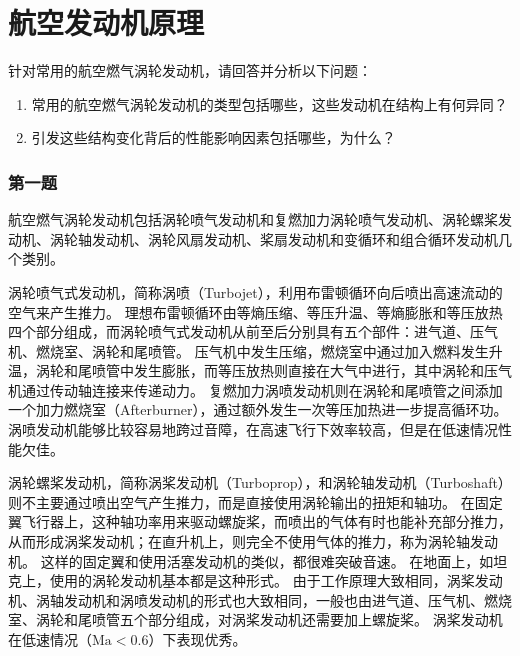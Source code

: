 
\part{航空发动机原理}

\begin{tcolorbox}
    针对常用的航空燃气涡轮发动机，请回答并分析以下问题：
    \begin{enumerate}
        \item 常用的航空燃气涡轮发动机的类型包括哪些，这些发动机在结构上有何异同？
        \item 引发这些结构变化背后的性能影响因素包括哪些，为什么？
    \end{enumerate}
\end{tcolorbox}

\section{第一题}

航空燃气涡轮发动机包括涡轮喷气发动机和复燃加力涡轮喷气发动机、涡轮螺桨发动机、涡轮轴发动机、涡轮风扇发动机、桨扇发动机和变循环和组合循环发动机几个类别。

涡轮喷气式发动机，简称涡喷（Turbojet），利用布雷顿循环向后喷出高速流动的空气来产生推力。
理想布雷顿循环由等熵压缩、等压升温、等熵膨胀和等压放热四个部分组成，而涡轮喷气式发动机从前至后分别具有五个部件：进气道、压气机、燃烧室、涡轮和尾喷管。
压气机中发生压缩，燃烧室中通过加入燃料发生升温，涡轮和尾喷管中发生膨胀，而等压放热则直接在大气中进行，其中涡轮和压气机通过传动轴连接来传递动力。
复燃加力涡喷发动机则在涡轮和尾喷管之间添加一个加力燃烧室（Afterburner），通过额外发生一次等压加热进一步提高循环功。
涡喷发动机能够比较容易地跨过音障，在高速飞行下效率较高，但是在低速情况性能欠佳。

涡轮螺桨发动机，简称涡桨发动机（Turboprop），和涡轮轴发动机（Turboshaft）则不主要通过喷出空气产生推力，而是直接使用涡轮输出的扭矩和轴功。
在固定翼飞行器上，这种轴功率用来驱动螺旋桨，而喷出的气体有时也能补充部分推力，从而形成涡桨发动机；在直升机上，则完全不使用气体的推力，称为涡轮轴发动机。
这样的固定翼和使用活塞发动机的类似，都很难突破音速。
在地面上，如坦克上，使用的涡轮发动机基本都是这种形式。
由于工作原理大致相同，涡桨发动机、涡轴发动机和涡喷发动机的形式也大致相同，一般也由进气道、压气机、燃烧室、涡轮和尾喷管五个部分组成，对涡桨发动机还需要加上螺旋桨。
涡桨发动机在低速情况（$\mathrm{Ma} < 0.6$）下表现优秀。

